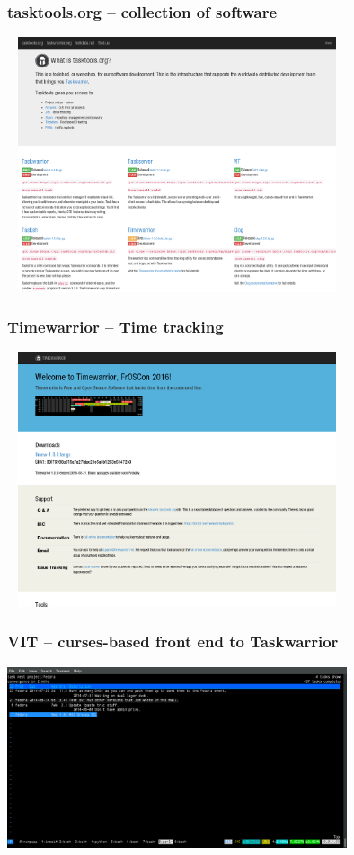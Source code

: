 \documentclass[t]{beamer}
\begin{document}
\begin{frame}\frametitle{tasktools.org -- collection of software}
    \begin{center}
        \href{http://tasktools.org/}{\includegraphics[width=10cm,height=7.5cm]{tasktools-org.png}}
    \end{center}
\end{frame}

\begin{frame}\frametitle{Timewarrior -- Time tracking}
    \begin{center}
        \href{http://timewarrior.net/}{\includegraphics[width=10cm,height=7.5cm]{timewarrior.png}}
    \end{center}
\end{frame}

\begin{frame}\frametitle{VIT -- curses-based front end to Taskwarrior}
    \vfill
    \begin{center}
        \href{http://tasktools.org/projects/vit.html}{\includegraphics[width=10cm]{vit-screenshot.png}}
    \end{center}
\end{frame}
\end{document}
